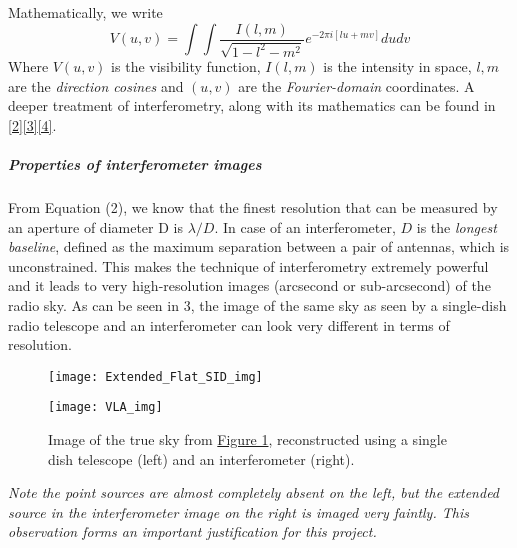 \documentclass{article}
\begin{document}
Mathematically, we write 
\begin{equation}
V(u,v) = \int\int\frac{I(l,m)}{\sqrt{1-l^2 - m^2}} e^{-2\pi i [lu+mv]} du dv
\end{equation} 
Where $V(u,v)$ is the visibility function, $I(l,m)$ is the intensity in space, $l, m$ are the \textit{direction cosines} and $(u,v)$ are the \textit{Fourier-domain} coordinates. A deeper treatment of interferometry, along with its mathematics can be found in \hyperref[ref2]{[2]}\hyperref[ref3]{[3]}\hyperref[ref4]{[4]}.
\subparagraph{Properties of interferometer images}
From Equation (2), we know that the finest resolution that can be measured by an aperture of diameter D is $\lambda/D$. In case of an interferometer, $D$ is the \textit{longest baseline}, defined as the maximum separation between a pair of antennas, which is unconstrained. 
This makes the technique of interferometry extremely powerful and it leads to very high-resolution images (arcsecond or sub-arcsecond) of the radio sky.
As can be seen in \figurename{ 3}, the image of the same sky as seen by a single-dish radio telescope and an interferometer can look very different in terms of resolution.
\begin{figure}[H]
\centering
\begin{minipage}[b]{.39\textwidth}
\texttt{[image: Extended\_Flat\_SID\_img]}
\end{minipage}%
\begin{minipage}[b]{.4\linewidth}
\texttt{[image: VLA\_img]}
\end{minipage}
\caption{Image of the true sky from \hyperref[ 1]{Figure 1}, reconstructed using a single dish telescope (left) and an interferometer (right). }
\label{3}
\end{figure}
\textit{Note the point sources are almost completely absent on the left, but the extended source in the interferometer image on the right is imaged very faintly. This observation forms an important justification for this project.}
\end{document}
